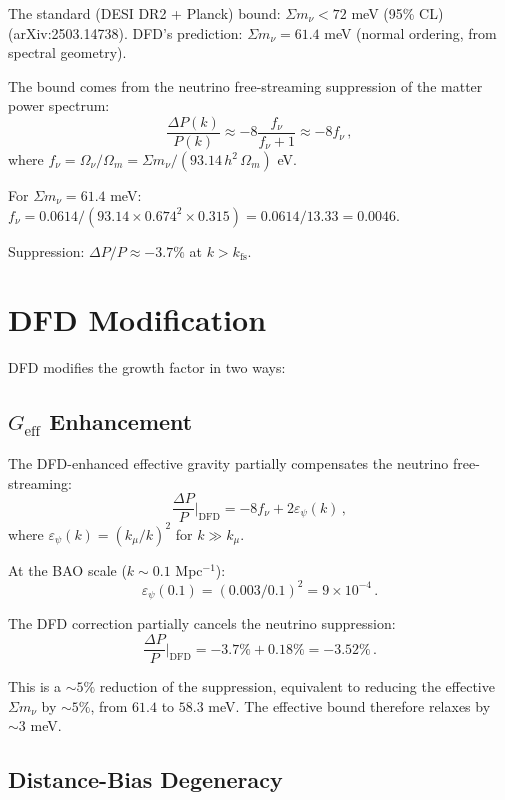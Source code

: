 \documentclass[11pt,a4paper]{article}
\begin{document}
The standard (DESI DR2 + Planck) bound: $\Sigma m_\nu < 72$ meV (95\% CL) (arXiv:2503.14738). DFD's prediction: $\Sigma m_\nu = 61.4$ meV (normal ordering, from spectral geometry).

The bound comes from the neutrino free-streaming suppression of the matter power spectrum:
\begin{equation}
\frac{\Delta P(k)}{P(k)} \approx -8\frac{f_\nu}{f_\nu + 1} \approx -8f_\nu\,,
\end{equation}
where $f_\nu = \Omega_\nu/\Omega_m = \Sigma m_\nu/(93.14\,h^2\,\Omega_m)$ eV.

For $\Sigma m_\nu = 61.4$ meV: $f_\nu = 0.0614/(93.14 \times 0.674^2 \times 0.315) = 0.0614/13.33 = 0.0046$.

Suppression: $\Delta P/P \approx -3.7\%$ at $k > k_{\mathrm{fs}}$.

\section{DFD Modification}

DFD modifies the growth factor in two ways:

\subsection{$G_{\mathrm{eff}}$ Enhancement}

The DFD-enhanced effective gravity partially compensates the neutrino free-streaming:
\begin{equation}
\frac{\Delta P}{P}\bigg|_{\mathrm{DFD}} = -8f_\nu + 2\varepsilon_\psi(k)\,,
\end{equation}
where $\varepsilon_\psi(k) = (k_\mu/k)^2$ for $k \gg k_\mu$.

At the BAO scale ($k \sim 0.1$ Mpc$^{-1}$):
\begin{equation}
\varepsilon_\psi(0.1) = (0.003/0.1)^2 = 9 \times 10^{-4}\,.
\end{equation}

The DFD correction partially cancels the neutrino suppression:
\begin{equation}
\frac{\Delta P}{P}\bigg|_{\mathrm{DFD}} = -3.7\% + 0.18\% = -3.52\%\,.
\end{equation}

This is a $\sim 5\%$ reduction of the suppression, equivalent to reducing the effective $\Sigma m_\nu$ by $\sim 5\%$, from $61.4$ to $58.3$ meV. The effective bound therefore relaxes by $\sim 3$ meV.

\subsection{Distance-Bias Degeneracy}
\end{document}

